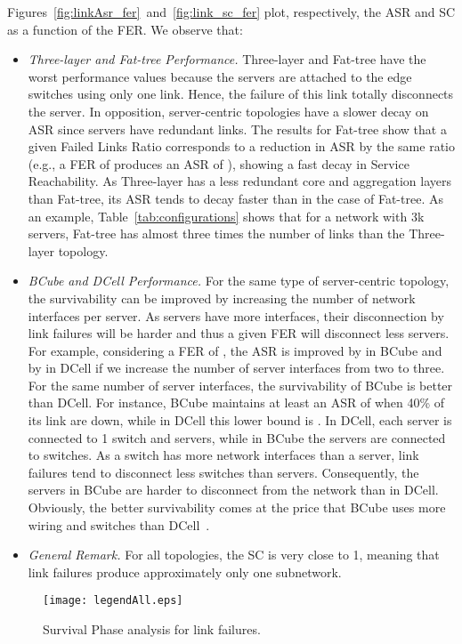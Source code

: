 Figures~\ref{fig:linkAsr_fer}~and~\ref{fig:link_sc_fer} plot, respectively, the ASR and SC as a function of the FER. We observe that:

\begin{itemize}
\item \textit{Three-layer and Fat-tree Performance.} Three-layer and Fat-tree have the worst performance values because the servers are attached to the edge switches using only one link. Hence, the failure of this link totally disconnects the server. In opposition, server-centric topologies have a slower decay on ASR since servers have redundant links. The results for Fat-tree show that a given Failed Links Ratio corresponds to a reduction in ASR by the same ratio (e.g., a FER of  produces an ASR of ), showing a fast decay in Service Reachability. As Three-layer has a less redundant core and aggregation layers than Fat-tree, its ASR tends to decay faster than in the case of Fat-tree. As an example, Table~\ref{tab:configurations} shows that for a network with 3k servers, Fat-tree has almost three times the number of links than the Three-layer topology.
\item \textit{BCube and DCell Performance.} For the same type of server-centric topology, the survivability can be improved by increasing the number of network interfaces per server. As servers have more interfaces, their disconnection by link failures will be harder and thus a given FER will disconnect less servers. For example, considering a FER of , the ASR is improved by  in BCube and by  in DCell if we increase the number of server interfaces from two to three. For the same number of server interfaces, the survivability of BCube is better than DCell. For instance, BCube maintains at least an ASR of  when 40\% of its link are down, while in DCell this lower bound is .
In DCell, each server is connected to 1 switch and  servers, while in BCube the servers are connected to  switches. As a switch has more network interfaces than a server, link failures tend to disconnect less switches than servers. Consequently, the servers in BCube are harder to disconnect from the network than in DCell. Obviously, the better survivability comes at the price that BCube uses more wiring and switches than DCell~\cite{guo2009bcube}.
\item \textit{General Remark.} For all topologies, the SC is very close to 1, meaning that link failures produce approximately only one subnetwork.
\end{itemize}
\begin{figure}
\centering
{}
{\texttt{[image: legendAll.eps]}}
\caption{Survival Phase analysis for link failures.}
\end{figure}

